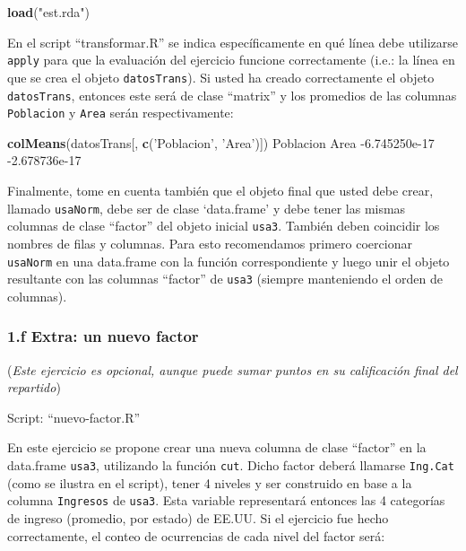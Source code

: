 \documentclass[]{article}
\newenvironment{Shaded}{}{}
\newcommand{\KeywordTok}[1]{\textcolor[rgb]{0.00,0.44,0.13}{\textbf{{#1}}}}
\newcommand{\FloatTok}[1]{\textcolor[rgb]{0.25,0.63,0.44}{{#1}}}
\newcommand{\StringTok}[1]{\textcolor[rgb]{0.25,0.44,0.63}{{#1}}}
\newcommand{\NormalTok}[1]{{#1}}
\begin{document}
\begin{Shaded}
\begin{Highlighting}[]
\KeywordTok{load}\NormalTok{(}\StringTok{"est.rda"}\NormalTok{)}
\end{Highlighting}
\end{Shaded}
En el script ``transformar.R'' se indica específicamente en qué línea
debe utilizarse \texttt{apply} para que la evaluación del ejercicio
funcione correctamente (i.e.: la línea en que se crea el objeto
\texttt{datosTrans}). Si usted ha creado correctamente el objeto
\texttt{datosTrans}, entonces este será de clase ``matrix'' y los
promedios de las columnas \texttt{Poblacion} y \texttt{Area} serán
respectivamente:

\begin{Shaded}
\begin{Highlighting}[]
\KeywordTok{colMeans}\NormalTok{(datosTrans[, }\KeywordTok{c}\NormalTok{(}\StringTok{'Poblacion'}\NormalTok{, }\StringTok{'Area'}\NormalTok{)])}
    \NormalTok{Poblacion          Area }
\NormalTok{-}\FloatTok{6.745250e-17} \NormalTok{-}\FloatTok{2.678736e-17}
\end{Highlighting}
\end{Shaded}
Finalmente, tome en cuenta también que el objeto final que usted debe
crear, llamado \texttt{usaNorm}, debe ser de clase `data.frame' y debe
tener las mismas columnas de clase ``factor'' del objeto inicial
\texttt{usa3}. También deben coincidir los nombres de filas y columnas.
Para esto recomendamos primero coercionar \texttt{usaNorm} en una
data.frame con la función correspondiente y luego unir el objeto
resultante con las columnas ``factor'' de \texttt{usa3} (siempre
manteniendo el orden de columnas).

\subsubsection{1.f Extra: un nuevo factor}

(\emph{Este ejercicio es opcional, aunque puede sumar puntos en su
calificación final del repartido})

Script: ``nuevo-factor.R''

En este ejercicio se propone crear una nueva columna de clase ``factor''
en la data.frame \texttt{usa3}, utilizando la función \texttt{cut}.
Dicho factor deberá llamarse \texttt{Ing.Cat} (como se ilustra en el
script), tener 4 niveles y ser construido en base a la columna
\texttt{Ingresos} de \texttt{usa3}. Esta variable representará
entonces las 4 categorías de ingreso (promedio, por estado) de EE.UU. Si
el ejercicio fue hecho correctamente, el conteo de ocurrencias de cada
nivel del factor será:
\end{document}
